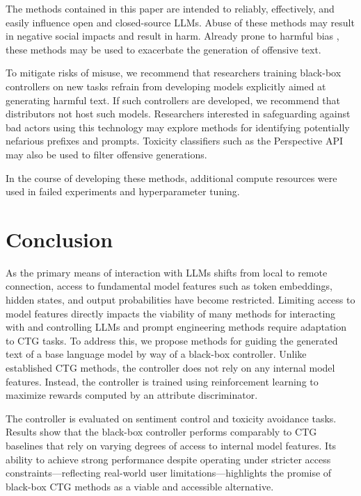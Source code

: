\documentclass[phd,electronic,oneside,twosidetoc,letterpaper,chaptercenter,parttop,lof]{byumsphd}
\begin{document}
The methods contained in this paper are intended to reliably, effectively, and easily influence open and closed-source LLMs. 
Abuse of these methods may result in negative social impacts and result in harm.
Already prone to harmful bias \citep{sheng2019bias}, these methods may be used to exacerbate the generation of offensive text.

To mitigate risks of misuse, we recommend that researchers training black-box controllers on new tasks refrain from developing models explicitly aimed at generating harmful text.
If such controllers are developed, we recommend that distributors not host such models.
Researchers interested in safeguarding against bad actors using this technology may explore methods for identifying potentially nefarious prefixes and prompts.
Toxicity classifiers such as the Perspective API may also be used to filter offensive generations.

In the course of developing these methods, additional compute resources were used in failed experiments and hyperparameter tuning.

%
\section{Conclusion}
\label{conclusion}

As the primary means of interaction with LLMs shifts from local to remote connection, access to fundamental model features such as token embeddings, hidden states, and output probabilities have become restricted.
Limiting access to model features directly impacts the viability of many methods for interacting with and controlling LLMs and prompt engineering methods require adaptation to CTG tasks.
To address this, we propose methods for guiding the generated text of a base language model by way of a black-box controller.
Unlike established CTG methods, the controller does not rely on any internal model features.
Instead, the controller is trained using reinforcement learning to maximize rewards computed by an attribute discriminator.

The controller is evaluated on sentiment control and toxicity avoidance tasks.
Results show that the black-box controller performs comparably to CTG baselines that rely on varying degrees of access to internal model features.
Its ability to achieve strong performance despite operating under stricter access constraints—reflecting real-world user limitations—highlights the promise of black-box CTG methods as a viable and accessible alternative.
\end{document}
